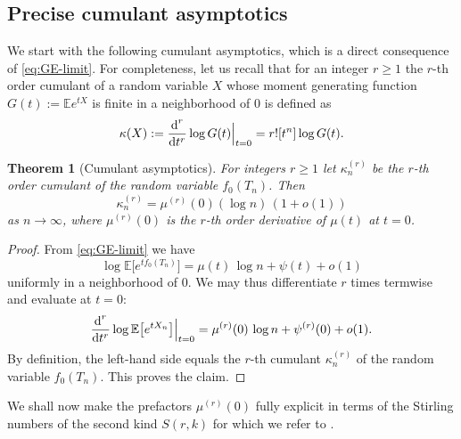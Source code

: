 \documentclass[11pt,a4paper]{article}
\numberwithin{equation}{section}
\newtheorem {theorem}{Theorem}[section]
\newcommand{\dint}{\textup{d}}
\def\EE{\mathbb{E}}
\begin{document}
\subsection{Precise cumulant asymptotics}

We start with the following cumulant asymptotics, which is a direct consequence of \eqref{eq:GE-limit}. For completeness, let us recall that for an integer $r\geq 1$ the $r$-th order cumulant of a random variable $X$ whose moment generating function $G(t):=\EE e^{tX}$ is finite in a neighborhood of $0$ is defined as
$$
\kappa(X) := {\dint^r\over\dint t^r}\log G(t)\Big|_{t=0} = r![t^n]\log G(t).
$$

\begin{theorem}[Cumulant asymptotics]\label{thm:CumulantAsymptotics}
For integers $r\geq 1$ let $\kappa^{(r)}_n$ be the $r$-th order cumulant of the random variable $f_0(T_n)$. Then
$$
\kappa_n^{(r)} = \mu^{(r)}(0)(\log n)\,(1+o(1))
$$
as $n\to\infty$, where $\mu^{(r)}(0)$ is the $r$-th order derivative of $\mu(t)$ at $t=0$.
\end{theorem}
\begin{proof}
From \eqref{eq:GE-limit} we have
\begin{equation*}
\log \EE\big[e^{t f_0(T_n)}\big]=\mu(t)\,\log n+\psi(t)+o(1) 
\end{equation*}
uniformly in a neighborhood of $0$. We may thus differentiate $r$ times termwise and evaluate at $t=0$:
\begin{equation*}
\frac{\dint^{r}}{\dint t^{r}}\log \EE\big[e^{tX_n}\big]\Big|_{t=0}
=\mu^{(r)}(0)\,\log n + \psi^{(r)}(0) + o(1).
\end{equation*}
By definition, the left-hand side equals the $r$-th cumulant $\kappa_n^{(r)}$ of the random variable $f_0(T_n)$. This proves the claim.
\end{proof}

We shall now make the prefactors $\mu^{(r)}(0)$ fully explicit in terms of the Stirling numbers of the second kind $S(r,k)$ for which we refer to \cite[Section 6.1]{ConcreteMathematics}.
\end{document}
